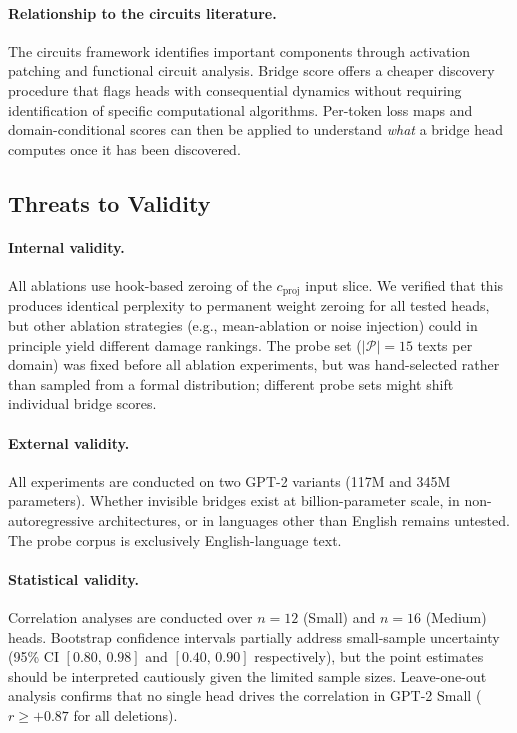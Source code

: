 \documentclass[11pt,a4paper]{article}
\theoremstyle{definition}
\theoremstyle{plain}
\begin{document}
\paragraph{Relationship to the circuits literature.}
The circuits framework \citep{elhage2021mathematical,olsson2022induction}
identifies important components through activation patching and functional
circuit analysis.
Bridge score offers a cheaper discovery procedure that flags heads with
consequential dynamics without requiring identification of specific
computational algorithms.
Per-token loss maps and domain-conditional scores can then be applied to
understand \emph{what} a bridge head computes once it has been discovered.

\subsection{Threats to Validity}
\label{sec:threats}

\paragraph{Internal validity.}
All ablations use hook-based zeroing of the $c_{\text{proj}}$ input slice.
We verified that this produces identical perplexity to permanent weight
zeroing for all tested heads, but other ablation strategies
(e.g., mean-ablation or noise injection) could in principle yield
different damage rankings.
The probe set ($|\mathcal{P}|=15$ texts per domain) was fixed before
all ablation experiments, but was hand-selected rather than sampled from
a formal distribution; different probe sets might shift individual bridge
scores.

\paragraph{External validity.}
All experiments are conducted on two GPT-2 variants (117M and 345M
parameters).
Whether invisible bridges exist at billion-parameter scale, in
non-autoregressive architectures, or in languages other than English
remains untested.
The probe corpus is exclusively English-language text.

\paragraph{Statistical validity.}
Correlation analyses are conducted over $n=12$ (Small) and $n=16$ (Medium)
heads.
Bootstrap confidence intervals partially address small-sample uncertainty
(95\% CI $[0.80,\,0.98]$ and $[0.40,\,0.90]$ respectively), but the
point estimates should be interpreted cautiously given the limited
sample sizes.
Leave-one-out analysis confirms that no single head drives the
correlation in GPT-2 Small ($r \geq +0.87$ for all deletions).
\end{document}
